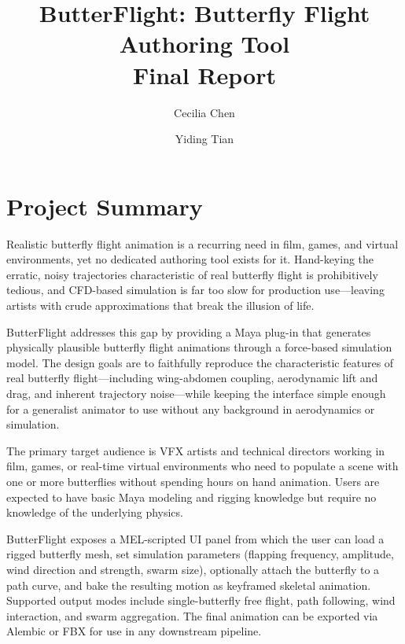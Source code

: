 \documentclass[12pt]{article}
\title{ButterFlight: Butterfly Flight Authoring Tool \\ \large Final Report}
\author{Cecilia Chen \and Yiding Tian}
\date{}
\begin{document}
\maketitle


\section*{Project Summary}

Realistic butterfly flight animation is a recurring need in film, games, and virtual
environments, yet no dedicated authoring tool exists for it. Hand-keying the erratic,
noisy trajectories characteristic of real butterfly flight is prohibitively tedious,
and CFD-based simulation is far too slow for production use---leaving artists with
crude approximations that break the illusion of life.

ButterFlight addresses this gap by providing a Maya plug-in that generates physically
plausible butterfly flight animations through a force-based simulation model. The
design goals are to faithfully reproduce the characteristic features of real butterfly
flight---including wing-abdomen coupling, aerodynamic lift and drag, and inherent
trajectory noise---while keeping the interface simple enough for a generalist animator
to use without any background in aerodynamics or simulation.

The primary target audience is VFX artists and technical directors working in film,
games, or real-time virtual environments who need to populate a scene with one or more
butterflies without spending hours on hand animation. Users are expected to have
basic Maya modeling and rigging knowledge but require no knowledge of the underlying
physics.

ButterFlight exposes a MEL-scripted UI panel from which the user can load a rigged
butterfly mesh, set simulation parameters (flapping frequency, amplitude, wind
direction and strength, swarm size), optionally attach the butterfly to a path curve,
and bake the resulting motion as keyframed skeletal animation. Supported output modes
include single-butterfly free flight, path following, wind interaction, and swarm
aggregation. The final animation can be exported via Alembic or FBX for use in any
downstream pipeline.
\end{document}
